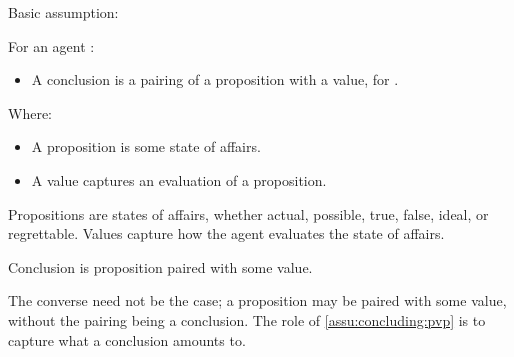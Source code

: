 \begin{note}
  Basic assumption:

  \begin{assumption}
    \label{assu:concluding:pvp}
    For an agent \vAgent{}:

    \begin{itemize}
    \item
      A conclusion is a pairing of a proposition with a value, for \vAgent{}.
    \end{itemize}

    Where:
    \begin{itemize}[noitemsep]
    \item
      A proposition is some state of affairs.
    \item
      A value captures an evaluation of a proposition.
    \end{itemize}
    \vspace{-\baselineskip}
  \end{assumption}

  Propositions are states of affairs, whether actual, possible, true, false, ideal, or regrettable.
  Values capture how the agent evaluates the state of affairs.

  Conclusion is proposition paired with some value.

  The converse need not be the case; a proposition may be paired with some value, without the pairing being a conclusion.
  The role of \autoref{assu:concluding:pvp} is to capture what a conclusion amounts to.
\end{note}

